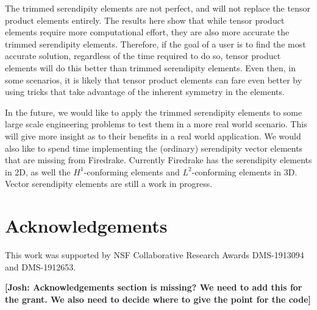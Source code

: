 \documentclass[manuscript,screen]{acmart}
\newcommand\josh[1]{\textbf{\textcolor[rgb]{0,.5,1}{[Josh: #1]}}}
\begin{document}
The trimmed serendipity elements are not perfect, and will not replace the tensor product elements entirely.  The results here show that while tensor product elements require more computational effort, they are also more accurate the trimmed serendipity elements.  Therefore, if the goal of a user is to find the most accurate solution, regardless of the time required to do so, tensor product elements will do this better than trimmed serendipity elements.  Even then, in some scenarios, it is likely that tensor product elements can fare even better by using tricks that take advantage of the inherent symmetry in the elements.  

In the future, we would like to apply the trimmed serendipity elements to some large scale engineering problems to test them in a more real world scenario.  This will give more insight as to their benefits in a real world application.  We would also like to spend time implementing the (ordinary) serendipity vector elements that are  missing from Firedrake.  Currently Firedrake has the serendipity elements in 2D, as well the $H^1$-conforming elements and $L^2$-conforming elements in 3D.  Vector serendipity elements are still a work in progress.




\section{Acknowledgements}

This work was supported by NSF Collaborative Research Awards DMS-1913094 and DMS-1912653.
    
\josh{Acknowledgements section is missing?  We need to add this for the grant.  We also need to decide where to give the point for the code}

    

\end{document}
